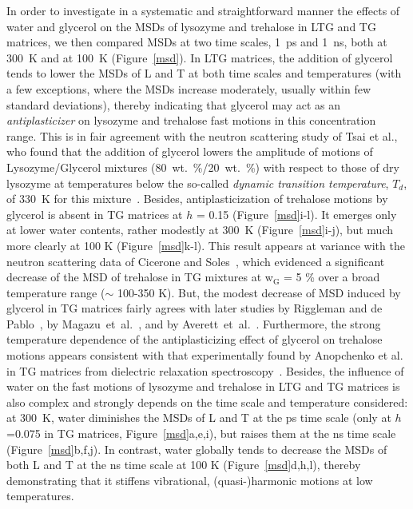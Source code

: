\documentclass[journal=jpcbfk,manuscript=article]{achemso}
\begin{document}
\begin{singlespacing}
In order to investigate in a systematic and straightforward manner the effects of water and glycerol on the MSDs 
of lysozyme and trehalose in LTG and TG matrices, we then compared MSDs at two time scales, 1~ps and 1~ns, both 
at 300~K and at 100~K (Figure~\ref{msd}). In LTG matrices, 
the addition of glycerol tends to lower the MSDs of L and T at both 
time scales and temperatures (with a few exceptions, where the MSDs increase moderately, usually within few standard deviations), thereby 
indicating that glycerol may act as an \textit{antiplasticizer} on lysozyme and trehalose fast motions in this concentration range. 
This is in fair agreement with the neutron scattering study of Tsai et al., who found that the addition of glycerol 
lowers the amplitude of motions of Lysozyme/Glycerol mixtures (80~wt.~\%/20~wt.~\%) with respect to those of dry lysozyme at temperatures 
below the so-called \textit{dynamic transition temperature}, $T_{d}$, of 330~K for this mixture~\cite{Tsai2000}.
Besides, antiplasticization of trehalose motions by glycerol is absent in TG matrices at $h$ = 0.15 (Figure~\ref{msd}i-l). It emerges 
only at lower water contents, rather modestly at 300~K (Figure~\ref{msd}i-j), but much more clearly at 100 K (Figure~\ref{msd}k-l). 
This result appears at variance with the neutron scattering data of Cicerone and Soles~\cite{Cicerone2004}, which evidenced a 
significant decrease of the MSD of trehalose in TG mixtures at w$_{\textrm{G}}$ = 5 \% over a broad temperature range 
($\sim$ 100-350 K). But, the modest decrease of MSD induced by glycerol in TG matrices fairly agrees with later studies 
by Riggleman and de Pablo~\cite{Riggleman2008}, by Magazu~et~al.~\cite{Magazu2010}, and by Averett~et~al.~\cite{Averett2012}. 
Furthermore, the strong temperature dependence of 
the antiplasticizing effect of glycerol on trehalose motions appears consistent
with that experimentally found by Anopchenko et al. in TG matrices from dielectric relaxation spectroscopy~\cite{Anopchenko2006,Obrzut2010}. 
Besides, the influence of water on the fast motions of 
lysozyme and trehalose in LTG and TG matrices is also complex and strongly depends on the time scale 
and temperature considered: at 300~K, water diminishes the MSDs of L and T at the ps time scale 
(only at $h$=0.075 in TG matrices, Figure~\ref{msd}a,e,i), but raises them at the ns time scale (Figure~\ref{msd}b,f,j). 
In contrast, water globally tends to decrease 
the MSDs of both L and T at the ns time scale at 100 K (Figure~\ref{msd}d,h,l), thereby demonstrating that it stiffens vibrational, 
(quasi-)harmonic motions at low temperatures. 

\end{singlespacing}
\end{document}
